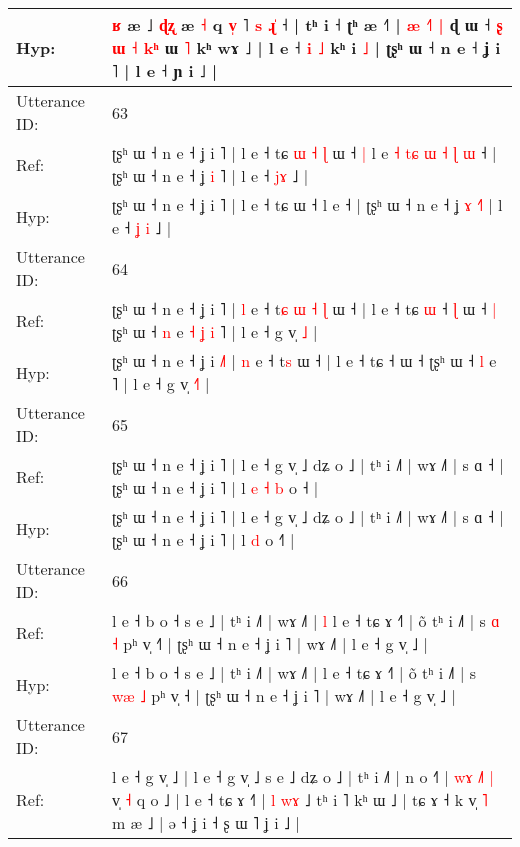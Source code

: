 \documentclass[10pt]{article}
\DeclareRobustCommand{\hl}[1]{{\textcolor{red}{#1}}}
\begin{document}
\begin{longtable}{ll}
 \\
Hyp: & \hl{ʁ} \hl{}æ ˩ \hl{ɖ}\hl{ʐ} æ \hl{˧} q \hl{v}\hl{̩} ˥ \hl{s} \hl{}\hl{ɻ}\hl{̍} ˧ | tʰ i ˧ ʈʰ æ ˧˥ |\hl{ }\hl{æ} \hl{˧}\hl{˥}\hl{ }\hl{|} ɖ ɯ ˧ \hl{}\hl{ʂ} \hl{}\hl{ɯ} \hl{˧} \hl{k}\hl{ʰ} ɯ \hl{˥} kʰ wɤ ˩ | l e ˧\hl{ }\hl{i}\hl{ }\hl{˩} kʰ i \hl{˩} | ʈʂʰ ɯ ˧ n e ˧ ʝ i ˥ | l e ˧ ɲ i ˩ |
 \\
\midrule
Utterance ID: & 63 \\
Ref: & ʈʂʰ ɯ ˧ n e ˧ ʝ i ˥ | l e ˧ tɕ\hl{ }\hl{ɯ}\hl{ }\hl{˧}\hl{ }\hl{ɭ} ɯ ˧\hl{ }\hl{|} l e\hl{ }\hl{˧}\hl{ }\hl{t}\hl{ɕ}\hl{ }\hl{ɯ}\hl{ }\hl{˧}\hl{ }\hl{ɭ}\hl{ }\hl{ɯ} ˧ | ʈʂʰ ɯ ˧ n e ˧ ʝ \hl{i} \hl{}˥ | l e ˧ \hl{}\hl{j}\hl{ɤ} ˩ |
 \\
Hyp: & ʈʂʰ ɯ ˧ n e ˧ ʝ i ˥ | l e ˧ tɕ\hl{}\hl{}\hl{}\hl{}\hl{}\hl{} ɯ ˧\hl{}\hl{} l e\hl{}\hl{}\hl{}\hl{}\hl{}\hl{}\hl{}\hl{}\hl{}\hl{}\hl{}\hl{}\hl{} ˧ | ʈʂʰ ɯ ˧ n e ˧ ʝ \hl{ɤ} \hl{˧}˥ | l e ˧ \hl{ʝ}\hl{ }\hl{i} ˩ |
 \\
\midrule
Utterance ID: & 64 \\
Ref: & ʈʂʰ ɯ ˧ n e ˧ ʝ i \hl{}˥ | \hl{l} e ˧ t\hl{ɕ}\hl{ }\hl{ɯ}\hl{ }\hl{˧}\hl{ }\hl{ɭ} ɯ ˧ | l e ˧ tɕ\hl{ }\hl{ɯ} ˧\hl{ }\hl{ɭ} ɯ ˧\hl{ }\hl{|} ʈʂʰ ɯ ˧ \hl{n} e\hl{ }\hl{˧}\hl{ }\hl{ʝ}\hl{ }\hl{i} ˥ | l e ˧ g v̩ \hl{}\hl{˩} |
 \\
Hyp: & ʈʂʰ ɯ ˧ n e ˧ ʝ i \hl{˩}˥ | \hl{n} e ˧ t\hl{}\hl{}\hl{}\hl{}\hl{}\hl{}\hl{s} ɯ ˧ | l e ˧ tɕ\hl{}\hl{} ˧\hl{}\hl{} ɯ ˧\hl{}\hl{} ʈʂʰ ɯ ˧ \hl{l} e\hl{}\hl{}\hl{}\hl{}\hl{}\hl{} ˥ | l e ˧ g v̩ \hl{˧}\hl{˥} |
 \\
\midrule
Utterance ID: & 65 \\
Ref: & ʈʂʰ ɯ ˧ n e ˧ ʝ i ˥ | l e ˧ g v̩ ˩ dʑ o ˩ | tʰ i ˩˥ | wɤ ˩˥ | s ɑ ˧ | ʈʂʰ ɯ ˧ n e ˧ ʝ i ˥ | l\hl{ }\hl{e}\hl{ }\hl{˧} \hl{b} o ˧\hl{} |
 \\
Hyp: & ʈʂʰ ɯ ˧ n e ˧ ʝ i ˥ | l e ˧ g v̩ ˩ dʑ o ˩ | tʰ i ˩˥ | wɤ ˩˥ | s ɑ ˧ | ʈʂʰ ɯ ˧ n e ˧ ʝ i ˥ | l\hl{}\hl{}\hl{}\hl{} \hl{d} o ˧\hl{˥} |
 \\
\midrule
Utterance ID: & 66 \\
Ref: & l e ˧ b o ˧ s e ˩ | tʰ i ˩˥ | wɤ ˩˥ |\hl{ }\hl{l} l e ˧ tɕ ɤ ˧˥ | õ tʰ i ˩˥ | s \hl{}\hl{ɑ} \hl{˧} pʰ v̩ ˧\hl{˥} | ʈʂʰ ɯ ˧ n e ˧ ʝ i ˥ | wɤ ˩˥ | l e ˧ g v̩ ˩ |
 \\
Hyp: & l e ˧ b o ˧ s e ˩ | tʰ i ˩˥ | wɤ ˩˥ |\hl{}\hl{} l e ˧ tɕ ɤ ˧˥ | õ tʰ i ˩˥ | s \hl{w}\hl{æ} \hl{˩} pʰ v̩ ˧\hl{} | ʈʂʰ ɯ ˧ n e ˧ ʝ i ˥ | wɤ ˩˥ | l e ˧ g v̩ ˩ |
 \\
\midrule
Utterance ID: & 67 \\
Ref: & l e ˧ g v̩ ˩ | l e ˧ g v̩ ˩ s e ˩ dʑ o ˩ | tʰ i ˩˥ | n o ˧\hl{˥} | \hl{w}\hl{ɤ} \hl{˩}\hl{˥} \hl{|} v̩ \hl{˧} q o ˩ | l e ˧ tɕ ɤ ˧˥ | \hl{l} \hl{w}\hl{ɤ} ˩ tʰ i ˥ kʰ ɯ ˩ | tɕ ɤ ˧ k v̩ \hl{˥} m æ ˩ | ə ˧ ʝ i ˧ ʂ ɯ ˥ ʝ i ˩ |

\end{longtable}
\end{document}

